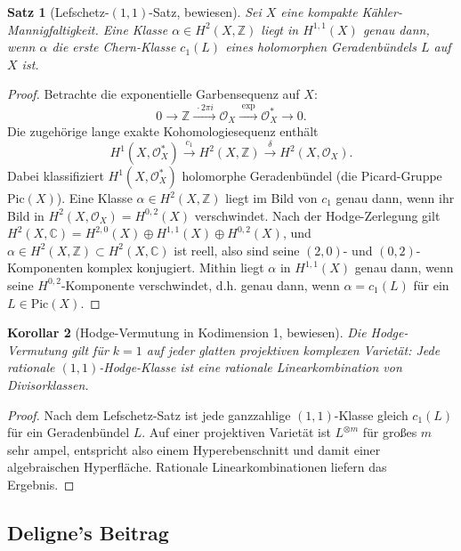 \documentclass[12pt,a4paper]{amsart}
\newtheorem{theorem}{Satz}[section]
\newtheorem{korollar}[theorem]{Korollar}
\theoremstyle{definition}
\theoremstyle{remark}
\begin{document}
\begin{theorem}[Lefschetz-$(1,1)$-Satz, bewiesen]
\label{thm:lefschetz11}
Sei $X$ eine kompakte Kähler-Mannigfaltigkeit. Eine Klasse $\alpha \in H^2(X, \mathbb{Z})$
liegt in $H^{1,1}(X)$ genau dann, wenn $\alpha$ die erste Chern-Klasse $c_1(L)$
eines holomorphen Geradenbündels $L$ auf $X$ ist.
\end{theorem}

\begin{proof}
Betrachte die exponentielle Garbensequenz auf $X$:
\[
  0 \longrightarrow \mathbb{Z} \xrightarrow{\;\cdot 2\pi i\;}
  \mathcal{O}_X \xrightarrow{\;\exp\;} \mathcal{O}_X^* \longrightarrow 0.
\]
Die zugehörige lange exakte Kohomologiesequenz enthält
\[
  H^1(X, \mathcal{O}_X^*) \xrightarrow{\;c_1\;} H^2(X, \mathbb{Z})
  \xrightarrow{\;\delta\;} H^2(X, \mathcal{O}_X).
\]
Dabei klassifiziert $H^1(X, \mathcal{O}_X^*)$ holomorphe Geradenbündel (die Picard-Gruppe
$\mathrm{Pic}(X)$). Eine Klasse $\alpha \in H^2(X,\mathbb{Z})$ liegt im Bild von $c_1$
genau dann, wenn ihr Bild in $H^2(X, \mathcal{O}_X) = H^{0,2}(X)$ verschwindet.
Nach der Hodge-Zerlegung gilt $H^2(X,\mathbb{C}) = H^{2,0}(X) \oplus H^{1,1}(X) \oplus H^{0,2}(X)$,
und $\alpha \in H^2(X,\mathbb{Z}) \subset H^2(X,\mathbb{C})$ ist reell, also sind seine
$(2,0)$- und $(0,2)$-Komponenten komplex konjugiert. Mithin liegt $\alpha$ in $H^{1,1}(X)$
genau dann, wenn seine $H^{0,2}$-Komponente verschwindet, d.h. genau dann, wenn
$\alpha = c_1(L)$ für ein $L \in \mathrm{Pic}(X)$.
\end{proof}

\begin{korollar}[Hodge-Vermutung in Kodimension 1, bewiesen]
\label{kor:hv1}
Die Hodge-Vermutung gilt für $k = 1$ auf jeder glatten projektiven komplexen Varietät:
Jede rationale $(1,1)$-Hodge-Klasse ist eine rationale Linearkombination von Divisorklassen.
\end{korollar}

\begin{proof}
Nach dem Lefschetz-Satz ist jede ganzzahlige $(1,1)$-Klasse gleich $c_1(L)$ für ein
Geradenbündel $L$. Auf einer projektiven Varietät ist $L^{\otimes m}$ für großes $m$
sehr ampel, entspricht also einem Hyperebenschnitt und damit einer algebraischen Hyperfläche.
Rationale Linearkombinationen liefern das Ergebnis.
\end{proof}

\subsection{Deligne's Beitrag}
\end{document}
